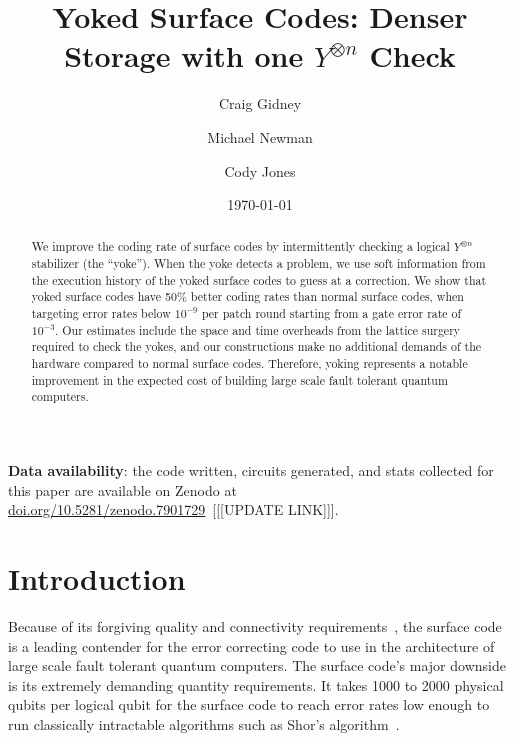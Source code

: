 \documentclass[onecolumn,unpublished,a4paper]{quantumarticle}
\theoremstyle{definition}
\theoremstyle{definition}
\theoremstyle{definition}
\begin{document}
\title{Yoked Surface Codes: Denser Storage with one $Y^{\otimes n}$ Check}

\date{\today}
\author{Craig Gidney}

\author{Michael Newman}

\author{Cody Jones}

\begin{abstract}
We improve the coding rate of surface codes by intermittently checking a logical $Y^{\otimes n}$ stabilizer (the ``yoke'').
When the yoke detects a problem, we use soft information from the execution history of the yoked surface codes to guess at a correction.
We show that yoked surface codes have 50\% better coding rates than normal surface codes, when targeting error rates below $10^{-9}$ per patch round starting from a gate error rate of $10^{-3}$.
Our estimates include the space and time overheads from the lattice surgery required to check the yokes, and our constructions make no additional demands of the hardware compared to normal surface codes.
Therefore, yoking represents a notable improvement in the expected cost of building large scale fault tolerant quantum computers.
\end{abstract}

\textbf{Data availability}: the code written, circuits generated, and stats collected for this paper are available on Zenodo at \href{https://doi.org/10.5281/zenodo.7901729}{doi.org/10.5281/zenodo.7901729}~\cite{gidneyhoneycombdata2022}[[[UPDATE LINK]]].

\maketitle

\tableofcontents

\section{Introduction}
\label{sec:introduction}

Because of its forgiving quality and connectivity requirements~\cite{fowler2012surfacecodereview}, the surface code is a leading contender for the error correcting code to use in the architecture of large scale fault tolerant quantum computers.
The surface code's major downside is its extremely demanding quantity requirements.
It takes 1000 to 2000 physical qubits per logical qubit for the surface code to reach error rates low enough to run classically intractable algorithms such as Shor's algorithm~\cite{shor1994,fowler2012surfacecodereview,gidney2021factor,soeken2020improved,litinskyhypercubeshor2023}.
\end{document}
